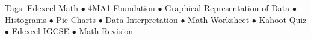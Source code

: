 \documentclass[11pt,a4paper]{article}
\begin{document}
\vspace{14pt}
\begin{center}
  \sffamily\scriptsize\textcolor{textmuted}{
    Tags: Edexcel Math $\bullet$ 4MA1 Foundation $\bullet$ Graphical Representation of Data $\bullet$ Histograms $\bullet$ Pie Charts $\bullet$ Data Interpretation $\bullet$ Math Worksheet $\bullet$ Kahoot Quiz $\bullet$ Edexcel IGCSE $\bullet$ Math Revision
  }
\end{center}
\end{document}
